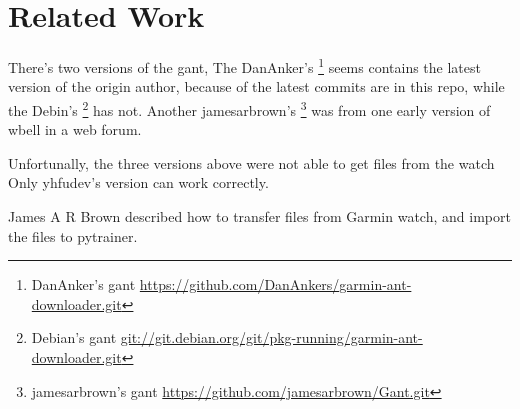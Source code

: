 \documentclass[letter,12pt,onecolumn]{article}
\newcommand{\cnt}[3]{{#1}{#2}{#3}}
\renewcommand{\cnt}[3]{#2}
\renewcommand{\cnt}[3]{#3}
\renewcommand{\cnt}[3]{#1}
\begin{document}
\section{\cnt{Related Work}{相关工作}{相關工作}}
\cnt{There's two versions of the gant,}{目前网上有两类版本的 gant 源代码，}{目前網上有兩類版本的 gant 源代碼，}
\cnt{The DanAnker's \footnote{DanAnker's gant \url{https://github.com/DanAnkers/garmin-ant-downloader.git}} seems contains the latest version  of the origin author,}
    {DanAnkers 版本 \footnote{DanAnker's gant \url{https://github.com/DanAnkers/garmin-ant-downloader.git}} 这个似乎更接近原作者最新的版本，}
    {DanAnkers 版本 \footnote{DanAnker's gant \url{https://github.com/DanAnkers/garmin-ant-downloader.git}} 這個似乎更接近原作者最新的版本，}
\cnt{because of the latest commits are in this repo, while the Debin's \footnote{Debian's gant \url{git://git.debian.org/git/pkg-running/garmin-ant-downloader.git}} has not.}
    {因为最后的两个提交在 Debian 的版本库中 \footnote{Debian's gant \url{git://git.debian.org/git/pkg-running/garmin-ant-downloader.git}} 没有。}
    {因為最後的兩個提交在 Debian 的版本庫中 \footnote{Debian's gant \url{git://git.debian.org/git/pkg-running/garmin-ant-downloader.git}} 沒有。}
\cnt{Another jamesarbrown's \footnote{jamesarbrown's gant \url{https://github.com/jamesarbrown/Gant.git}} was from one early version of wbell in a web forum.}
    {另外一个 jamesarbrown 的版本是源于某论坛上 wbell 的一个早期版本 \footnote{jamesarbrown's gant \url{https://github.com/jamesarbrown/Gant.git}}。}
    {另外一個 jamesarbrown 的版本是源於某論壇上 wbell 的一個早期版本 \footnote{jamesarbrown's gant \url{https://github.com/jamesarbrown/Gant.git}}。}

\cnt{Unfortunally, the three versions above were not able to get files from the watch}{可惜的是上述三个版本都没测试成功，}{可惜的是上述三個版本都沒測試成功，}
\cnt{Only yhfudev's version can work correctly.}
    {只有 yhfudev 的版本
    \cite{gant405}
    才可以获取文件。}
    {只有 yhfudev 的版本 \cite{gant405} 才可以獲取文件。}

\cnt{James A R Brown \cite{jbrown405linux} described how to transfer files from Garmin watch, and import the files to pytrainer.}
    {James A R Brown 在 \cite{jbrown405linux} 中介绍如何在 Linux Fedora 下使用 Gant 从Garmin 手表中获取文件，并且将获得的文件导入 pytrainer 中使用。}
    {James A R Brown 在 \cite{jbrown405linux} 中介紹如何在 Linux Fedora 下使用 Gant 從Garmin 手表中獲取文件，並且將獲得的文件導入 pytrainer 中使用。}
\end{document}
